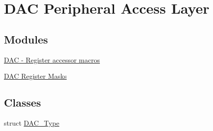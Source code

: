 \hypertarget{group__DAC__Peripheral__Access__Layer}{}\section{D\+AC Peripheral Access Layer}
\label{group__DAC__Peripheral__Access__Layer}
\subsection*{Modules}
\begin{DoxyCompactItemize}
\item 
\hyperlink{group__DAC__Register__Accessor__Macros}{D\+A\+C -\/ Register accessor macros}
\item 
\hyperlink{group__DAC__Register__Masks}{D\+A\+C Register Masks}
\end{DoxyCompactItemize}
\subsection*{Classes}
\begin{DoxyCompactItemize}
\item 
struct \hyperlink{structDAC__Type}{D\+A\+C\+\_\+\+Type}
\end{DoxyCompactItemize}

